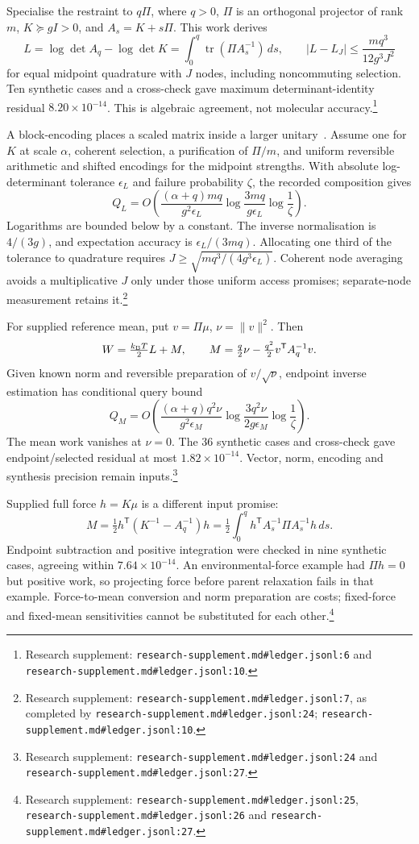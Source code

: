 \documentclass{article}
\begin{document}
Specialise the restraint to \(q\Pi\), where \(q>0\), \(\Pi\) is an orthogonal projector of rank \(m\), \(K\succeq gI>0\), and \(A_s=K+s\Pi\). This work derives
\[
 L=\log\det A_q-\log\det K
  =\int_0^q\operatorname{tr}(\Pi A_s^{-1})\,ds,
 \qquad
 |L-L_J|\leq\frac{mq^3}{12g^3J^2}
\]
for equal midpoint quadrature with \(J\) nodes, including noncommuting selection. Ten synthetic cases and a cross-check gave maximum determinant-identity residual \(8.20\times10^{-14}\). This is algebraic agreement, not molecular accuracy.\footnote{Research supplement: \nolinkurl{research-supplement.md#ledger.jsonl:6} and \nolinkurl{research-supplement.md#ledger.jsonl:10}.}

A block-encoding places a scaled matrix inside a larger unitary~\cite{P}. Assume one for \(K\) at scale \(\alpha\), coherent selection, a purification of \(\Pi/m\), and uniform reversible arithmetic and shifted encodings for the midpoint strengths. With absolute log-determinant tolerance \(\epsilon_L\) and failure probability \(\zeta\), the recorded composition gives
\[
 Q_L=O\!\left(
 \frac{(\alpha+q)mq}{g^2\epsilon_L}
 \log\frac{3mq}{g\epsilon_L}\log\frac1\zeta\right).
\]
Logarithms are bounded below by a constant. The inverse normalisation is \(4/(3g)\), and expectation accuracy is \(\epsilon_L/(3mq)\). Allocating one third of the tolerance to quadrature requires \(J\geq\sqrt{mq^3/(4g^3\epsilon_L)}\). Coherent node averaging avoids a multiplicative \(J\) only under those uniform access promises; separate-node measurement retains it.\footnote{Research supplement: \nolinkurl{research-supplement.md#ledger.jsonl:7}, as completed by \nolinkurl{research-supplement.md#ledger.jsonl:24}; \nolinkurl{research-supplement.md#ledger.jsonl:10}.}

For supplied reference mean, put \(v=\Pi\mu\), \(\nu=\|v\|^2\). Then
\[
 W=\tfrac{k_{\rm B}T}{2}L+M,\qquad
 M=\tfrac q2\nu-\tfrac{q^2}{2}v^{\mathsf T}A_q^{-1}v.
\]
Given known norm and reversible preparation of \(v/\sqrt\nu\), endpoint inverse estimation has conditional query bound
\[
 Q_M=O\!\left(
 \frac{(\alpha+q)q^2\nu}{g^2\epsilon_M}
 \log\frac{3q^2\nu}{2g\epsilon_M}\log\frac1\zeta\right).
\]
The mean work vanishes at \(\nu=0\). The 36 synthetic cases and cross-check gave endpoint/selected residual at most \(1.82\times10^{-14}\). Vector, norm, encoding and synthesis precision remain inputs.\footnote{Research supplement: \nolinkurl{research-supplement.md#ledger.jsonl:24} and \nolinkurl{research-supplement.md#ledger.jsonl:27}.}

Supplied full force \(h=K\mu\) is a different input promise:
\[
 M=\tfrac12h^{\mathsf T}(K^{-1}-A_q^{-1})h
  =\tfrac12\int_0^q h^{\mathsf T}A_s^{-1}\Pi A_s^{-1}h\,ds.
\]
Endpoint subtraction and positive integration were checked in nine synthetic cases, agreeing within \(7.64\times10^{-14}\). An environmental-force example had \(\Pi h=0\) but positive work, so projecting force before parent relaxation fails in that example. Force-to-mean conversion and norm preparation are costs; fixed-force and fixed-mean sensitivities cannot be substituted for each other.\footnote{Research supplement: \nolinkurl{research-supplement.md#ledger.jsonl:25}, \nolinkurl{research-supplement.md#ledger.jsonl:26} and \nolinkurl{research-supplement.md#ledger.jsonl:27}.}
\end{document}
